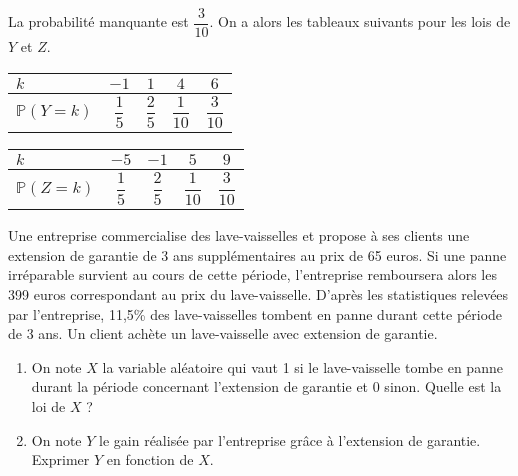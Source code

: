 \documentclass[11pt,fleqn, openany]{book} %
\begin{document}
\begin{solution}La probabilité manquante est $\dfrac{3}{10}$. On a alors les tableaux suivants pour les lois de $Y$ et $Z$.

\begin{minipage}{0.45\linewidth}
\renewcommand{\arraystretch}{2.2}
\begin{center}
\begin{tabular}{|l|c|c|c|c|}
\hline
$k$ & $-1$& $1$ & $4$ & $6$ \\
\hline
$\mathbb{P}(Y=k)$ & $\dfrac{1}{5}$ & $\dfrac{2}{5}$ & $\dfrac{1}{10}$   & $\dfrac{3}{10}$ \\
\hline \end{tabular}
\end{center}\end{minipage}\hfill \begin{minipage}{0.45\linewidth}
\renewcommand{\arraystretch}{2.2}
\begin{center}
\begin{tabular}{|l|c|c|c|c|}
\hline
$k$ & $-5$& $-1$ & $5$ & $9$ \\
\hline
$\mathbb{P}(Z=k)$ & $\dfrac{1}{5}$ & $\dfrac{2}{5}$ & $\dfrac{1}{10}$   & $\dfrac{3}{10}$ \\
\hline \end{tabular}
\end{center}\end{minipage}

\end{solution}



\begin{exercise}Une entreprise commercialise des lave-vaisselles et propose à ses clients une extension de garantie de 3 ans supplémentaires au prix de 65 euros. Si une panne irréparable survient au cours de cette période, l'entreprise remboursera alors les 399 euros correspondant au prix du lave-vaisselle. D'après les statistiques relevées par l'entreprise, 11,5\% des lave-vaisselles tombent en panne durant cette période de 3 ans. Un client achète un lave-vaisselle avec extension de garantie.
\begin{enumerate}
\item On note $X$ la variable aléatoire qui vaut 1 si le lave-vaisselle tombe en panne durant la période concernant l'extension de garantie et 0 sinon. Quelle est la loi de $X$ ?
\item On note $Y$ le gain réalisée par l'entreprise grâce à l'extension de garantie. Exprimer $Y$ en fonction de $X$.
\end{enumerate}\end{exercise}
\end{document}
